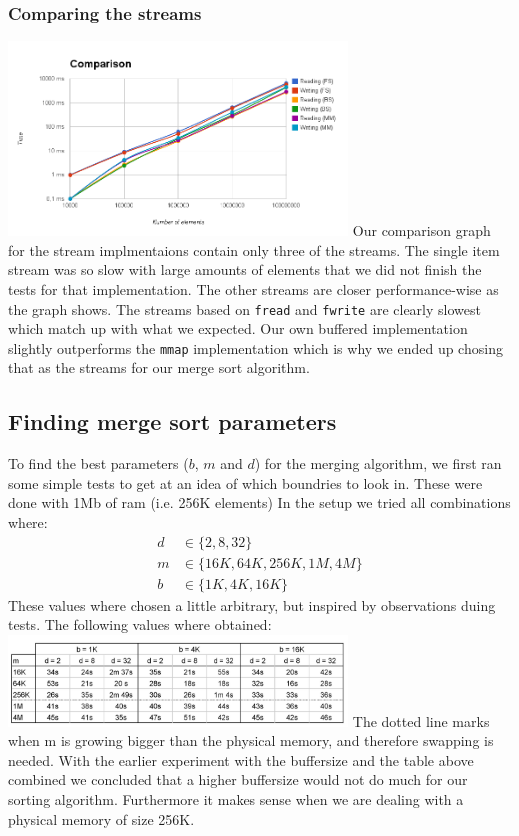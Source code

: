 \subsubsection{Comparing the streams}
\includegraphics[width=90mm]{graphics/StreamCompare.png}
Our comparison graph for the stream implmentaions contain only three of the streams. The single item stream was so slow with large amounts of elements that we did not finish the tests for that implementation. The other streams are closer performance-wise as the graph shows. The streams based on \texttt{fread} and \texttt{fwrite} are clearly slowest which match up with what we expected. Our own buffered implementation slightly outperforms the \texttt{mmap} implementation which is why we ended up chosing that as the streams for our merge sort algorithm.

\subsection{ Finding merge sort parameters}
To find the best parameters ($b$, $m$ and $d$) for the merging algorithm, we first ran some simple tests to get at an idea of which boundries to look in. These were done with 1Mb of ram (i.e. 256K elements) In the setup we tried all combinations where:
\begin{align*}
	d &\in \{2, 8, 32\} \\
	m &\in \{16K, 64K, 256K, 1M, 4M\} \\
	b &\in \{1K, 4K, 16K\}
\end{align*}
These values where chosen a little arbitrary, but inspired by observations duing tests. The following values where obtained:
\includegraphics[width=90mm]{graphics/FindingParams.jpg}
The dotted line marks when m is growing bigger than the physical memory, and therefore swapping is needed. With the earlier experiment with the buffersize and the table above combined we concluded that a higher buffersize would not do much for our sorting algorithm. Furthermore it makes sense when we are dealing with a physical memory of size 256K.

